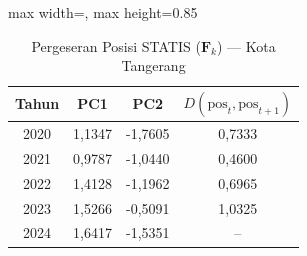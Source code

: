 \begin{table}[H]
\centering
\caption{Pergeseran Posisi STATIS ($\mathbf{F}_k$) --- Kota Tangerang} \label{tab:app2jarak_statis_skor_kota_tangerang}
\begin{adjustbox}{max width=\textwidth, max height=0.85\textheight}
\begin{tabular}{|c|c|c|c|}
\hline
\textbf{Tahun} & \textbf{PC1} & \textbf{PC2} & \textbf{$D(\text{pos}_t, \text{pos}_{t+1})$} \\
\hline
2020 & 1,1347 & -1,7605 & 0,7333 \\
2021 & 0,9787 & -1,0440 & 0,4600 \\
2022 & 1,4128 & -1,1962 & 0,6965 \\
2023 & 1,5266 & -0,5091 & 1,0325 \\
2024 & 1,6417 & -1,5351 & -- \\
\hline
\end{tabular}
\end{adjustbox}
\end{table}